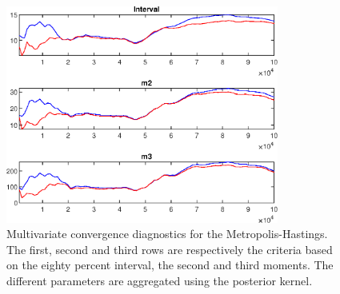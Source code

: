  
\begin{figure}[H]
\centering 
\includegraphics[width=0.8\textwidth]{BRS_sectoral_artificial_data/Output/BRS_sectoral_artificial_data_mdiag}
\caption{Multivariate convergence diagnostics for the Metropolis-Hastings.
The first, second and third rows are respectively the criteria based on
the eighty percent interval, the second and third moments. The different 
parameters are aggregated using the posterior kernel.}\label{Fig:MultivariateDiagnostics}
\end{figure}

